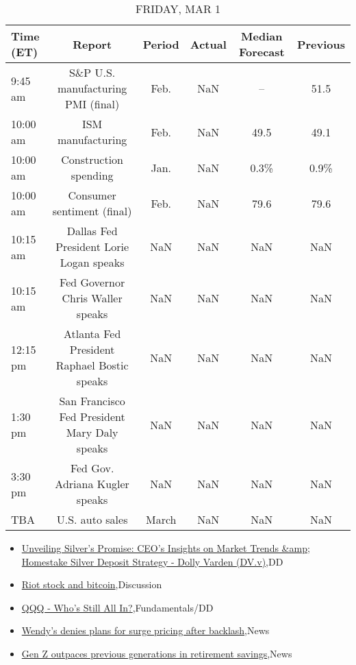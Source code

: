 \documentclass{article}%
\begin{document}
%


\begin{table}[htbp]%
\caption{FRIDAY, MAR 1}%
\centering%
\begin{adjustbox}{width=1\textwidth}%
\begin{tabular}{lccccc}
\toprule
Time (ET) &                                       Report & Period & Actual & Median Forecast & Previous \\
\midrule
  9:45 am &           S\&P U.S. manufacturing PMI (final) &   Feb. &    NaN &              -- &     51.5 \\
 10:00 am &                            ISM manufacturing &   Feb. &    NaN &            49.5 &     49.1 \\
 10:00 am &                        Construction spending &   Jan. &    NaN &            0.3\% &     0.9\% \\
 10:00 am &                   Consumer sentiment (final) &   Feb. &    NaN &            79.6 &     79.6 \\
 10:15 am &      Dallas Fed President Lorie Logan speaks &    NaN &    NaN &             NaN &      NaN \\
 10:15 am &             Fed Governor Chris Waller speaks &    NaN &    NaN &             NaN &      NaN \\
 12:15 pm &  Atlanta Fed President Raphael Bostic speaks &    NaN &    NaN &             NaN &      NaN \\
  1:30 pm & San Francisco Fed President Mary Daly speaks &    NaN &    NaN &             NaN &      NaN \\
  3:30 pm &               Fed Gov. Adriana Kugler speaks &    NaN &    NaN &             NaN &      NaN \\
      TBA &                              U.S. auto sales &  March &    NaN &             NaN &      NaN \\
\bottomrule
\end{tabular}
%
\end{adjustbox}%
\end{table}

%
\begin{itemize}%
\item%
\href{https://reddit.com/r/Baystreetbets/comments/1b2lz3x/unveiling\_silvers\_promise\_ceos\_insights\_on\_market/}{Unveiling Silver's Promise: CEO's Insights on Market Trends \&amp; Homestake Silver Deposit Strategy - Dolly Varden (DV.v)},DD%
\item%
\href{https://reddit.com/r/StockMarket/comments/1b2t4ku/riot\_stock\_and\_bitcoin/}{Riot stock and bitcoin},Discussion%
\item%
\href{https://reddit.com/r/StockMarket/comments/1b27hvd/qqq\_whos\_still\_all\_in/}{QQQ - Who's Still All In?},Fundamentals/DD%
\item%
\href{https://reddit.com/r/Economics/comments/1b2rkhb/wendys\_denies\_plans\_for\_surge\_pricing\_after/}{Wendy's denies plans for surge pricing after backlash},News%
\item%
\href{https://reddit.com/r/Economics/comments/1b2kwwe/gen\_z\_outpaces\_previous\_generations\_in\_retirement/}{Gen Z outpaces previous generations in retirement savings},News%
\end{itemize}%
\end{document}
